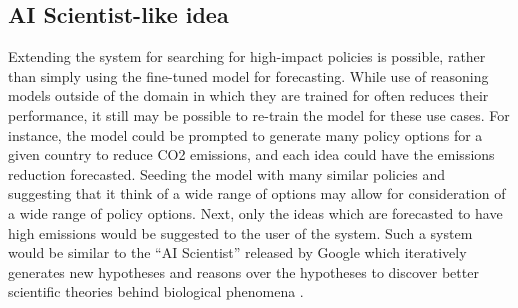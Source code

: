 \documentclass[12pt,a4paper]{article}
\begin{document}
\subsection{AI Scientist-like idea}
Extending the system for searching for high-impact policies is possible, rather than simply using the fine-tuned model for forecasting. While use of reasoning models outside of the domain in which they are trained for often reduces their performance, it still may be possible to re-train the model for these use cases. For instance, the model could be prompted to generate many policy options for a given country to reduce CO2 emissions, and each idea could have the emissions reduction forecasted. Seeding the model with many similar policies and suggesting that it think of a wide range of options may allow for consideration of a wide range of policy options. Next, only the ideas which are forecasted to have high emissions would be suggested to the user of the system. Such a system would be similar to the ``AI Scientist'' released by Google which iteratively generates new hypotheses and reasons over the hypotheses to discover better scientific theories behind biological phenomena .
\end{document}
